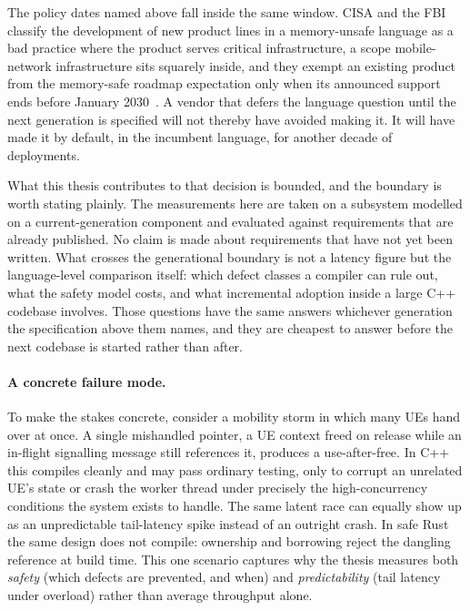 \documentclass[english,oneside,a4paper,censored,csm,software-track-2020]{HYthesisML}
\begin{document}
The policy dates named above fall inside the same window. CISA and the FBI classify the
development of new product lines in a memory-unsafe language as a bad practice where the product
serves critical infrastructure, a scope mobile-network infrastructure sits squarely inside, and
they exempt an existing product from the memory-safe roadmap expectation only when its announced
support ends before January 2030~\cite{cisa2025badpractices}. A vendor that defers the language
question until the next generation is specified will not thereby have avoided making it. It will
have made it by default, in the incumbent language, for another decade of deployments.

What this thesis contributes to that decision is bounded, and the boundary is worth stating
plainly. The measurements here are taken on a subsystem modelled on a current-generation
component and evaluated against requirements that are already published. No claim is made about
requirements that have not yet been written. What crosses the generational boundary is not a
latency figure but the language-level comparison itself: which defect classes a compiler can rule
out, what the safety model costs, and what incremental adoption inside a large C++ codebase
involves. Those questions have the same answers whichever generation the specification above them
names, and they are cheapest to answer before the next codebase is started rather than after.

\paragraph{A concrete failure mode.}
To make the stakes concrete, consider a mobility storm in which many UEs hand over at once. A
single mishandled pointer, a UE context freed on release while an in-flight signalling message
still references it, produces a use-after-free. In C++ this compiles cleanly and may pass
ordinary testing, only to corrupt an unrelated UE's state or crash the worker thread under
precisely the high-concurrency conditions the system exists to handle. The same latent race
can equally show up as an unpredictable tail-latency spike instead of an outright crash. In
safe Rust the same design does not compile: ownership and borrowing reject the dangling
reference at build time. This one scenario captures why the thesis measures both
\emph{safety} (which defects are prevented, and when) and \emph{predictability} (tail
latency under overload) rather than average throughput alone.
\end{document}
